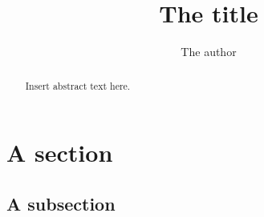 \documentclass[11pt,a4paper]{article}
\title{The title}
\author{The author}
\begin{document}
\maketitle

\begin{abstract}
Insert abstract text here.
\end{abstract}

\tableofcontents

\section{A section}
\label{sec: a section}

\subsection{A subsection}
\label{sec: a subsection}


\end{document}
